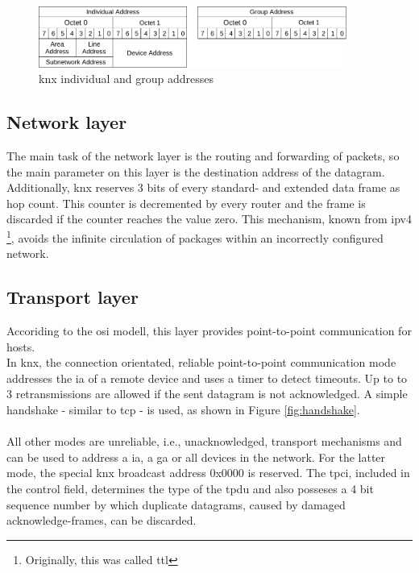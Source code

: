 \begin{figure}
 \centering
    \includegraphics[width=0.9\textwidth]{figures/addresses}
 \caption{\gls{knx} individual and group addresses} 
\label{fig:knxAddr}
\end{figure}


\subsection{Network layer}

The main task of the network layer is the routing and forwarding of packets, so the main parameter on this layer is the destination address of the
datagram. Additionally, \gls{knx} reserves 3 bits of every standard- and extended data frame as
hop count. This counter is decremented by every router and the frame is discarded if the counter reaches the value zero. This mechanism, known from
\gls{ipv4} \cite{rfc791} \footnote{Originally, this was called \gls{ttl}}, avoids the infinite circulation of packages within an incorrectly configured network.

\subsection{Transport layer}\label{sec:knxTransportLayer}

Accoriding to the \gls{osi} modell, this layer provides point-to-point communication for hosts.
\\
In \gls{knx}, the connection orientated, reliable point-to-point communication mode addresses the \gls{ia} of a remote device and uses a timer to detect timeouts.
Up to to 3 retransmissions are allowed if the sent datagram is not acknowledged. A simple handshake - similar to \gls{tcp} - is used, as shown in Figure \ref{fig:handshake}.
\\
\\
All other modes are unreliable, i.e., unacknowledged, transport mechanisms and can be used to address a \gls{ia}, a \gls{ga} or all devices in the
network. For the latter mode, the special \gls{knx} broadcast address 0x0000 is reserved. 
The \gls{tpci}, included in the control field, determines the type of the \gls{tpdu} and also posseses a 4 bit sequence number by which duplicate datagrams, caused by damaged 
acknowledge-frames, can be discarded.

